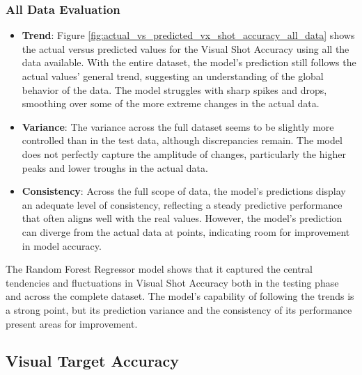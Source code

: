 \subsubsection*{All Data Evaluation}

\begin{itemize}
    \item \textbf{Trend}: Figure \ref{fig:actual_vs_predicted_vx_shot_accuracy_all_data} shows the actual versus predicted values for the Visual Shot Accuracy using all the data available.
          With the entire dataset, the model's prediction still follows the actual values' general trend, suggesting an understanding of the global behavior of the data. The model struggles
          with sharp spikes and drops, smoothing over some of the more extreme changes in the actual data.

    \item \textbf{Variance}: The variance across the full dataset seems to be slightly more controlled than in the test data, although discrepancies remain. The model does not perfectly capture
          the amplitude of changes, particularly the higher peaks and lower troughs in the actual data.

    \item \textbf{Consistency}: Across the full scope of data, the model's predictions display an adequate level of consistency, reflecting a steady predictive performance that often aligns well with the real values.
          However, the model's prediction can diverge from the actual data at points, indicating room for improvement in model accuracy.

\end{itemize}

The Random Forest Regressor model shows that it captured the central tendencies and fluctuations in Visual Shot Accuracy both in the testing phase and across the complete dataset. The model's capability of
following the trends is a strong point, but its prediction variance and the consistency of its performance present areas for improvement.


\subsection*{Visual Target Accuracy}

